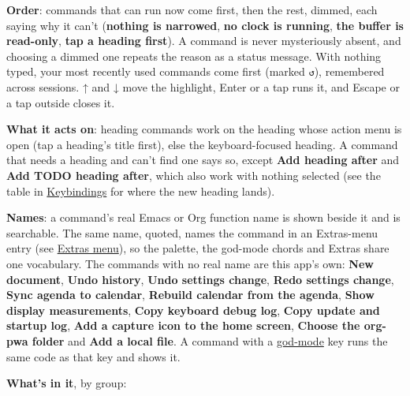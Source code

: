 \documentclass[11pt]{article}
\begin{document}
\textbf{Order}: commands that can run now come first, then the rest, dimmed, each saying why it can't (\textbf{nothing is narrowed}, \textbf{no clock is running}, \textbf{the buffer is read-only}, \textbf{tap a heading first}). A command is never mysteriously absent, and choosing a dimmed one repeats the reason as a status message. With nothing typed, your most recently used commands come first (marked \texttt{↺}), remembered across sessions. ↑ and ↓ move the highlight, Enter or a tap runs it, and Escape or a tap outside closes it.

\textbf{What it acts on}: heading commands work on the heading whose action menu is open (tap a heading's title first), else the keyboard-focused heading. A command that needs a heading and can't find one says so, except \textbf{Add heading after} and \textbf{Add TODO heading after}, which also work with nothing selected (see the table in \hyperref[sec:orga8a12f7]{Keybindings} for where the new heading lands).

\textbf{Names}: a command's real Emacs or Org function name is shown beside it and is searchable. The same name, quoted, names the command in an Extras-menu entry (see \hyperref[sec:org147f9a0]{Extras menu}), so the palette, the god-mode chords and Extras share one vocabulary. The commands with no real name are this app's own: \textbf{New document}, \textbf{Undo history}, \textbf{Undo settings change}, \textbf{Redo settings change}, \textbf{Sync agenda to calendar}, \textbf{Rebuild calendar from the agenda}, \textbf{Show display measurements}, \textbf{Copy keyboard debug log}, \textbf{Copy update and startup log}, \textbf{Add a capture icon to the home screen}, \textbf{Choose the org-pwa folder} and \textbf{Add a local file}. A command with a \hyperref[sec:orgc091c26]{god-mode} key runs the same code as that key and shows it.

\textbf{What's in it}, by group:
\end{document}
